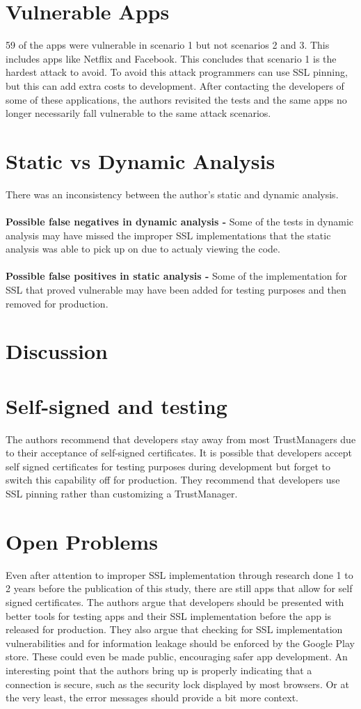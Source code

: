 \documentclass{article}
\begin{document}
\section*{Vulnerable Apps}
59 of the apps were vulnerable in scenario 1 but not scenarios 2 and 3. This includes apps like Netflix and Facebook. This concludes that scenario 1 is the hardest attack to avoid. To avoid this attack programmers can use SSL pinning, but this can add extra costs to development. After contacting the developers of some of these applications, the authors revisited the tests and the same apps no longer necessarily fall vulnerable to the same attack scenarios. 
\section*{Static vs Dynamic Analysis}
There was an inconsistency between the author's static and dynamic analysis.
\\\\\textbf{Possible false negatives in dynamic analysis -} Some of the tests in dynamic analysis may have missed the improper SSL implementations that the static analysis was able to pick up on due to actualy viewing the code. 
\\\\\textbf{Possible false positives in static analysis -} Some of the implementation for SSL that proved vulnerable may have been added for testing purposes and then removed for production.

\section{Discussion}
\section*{Self-signed and testing}
The authors recommend that developers stay away from most TrustManagers due to their acceptance of self-signed certificates. It is possible that developers accept self signed certificates for testing purposes during development but forget to switch this capability off for production. They recommend that developers use SSL pinning rather than customizing a TrustManager. 
\section*{Open Problems}
Even after attention to improper SSL implementation through research done 1 to 2 years before the publication of this study, there are still apps that allow for self signed certificates. The authors argue that developers should be presented with better tools for testing apps and their SSL implementation before the app is released for production. They also argue that checking for SSL implementation vulnerabilities and for information leakage should be enforced by the Google Play store. These could even be made public, encouraging safer app development. An interesting point that the authors bring up is properly indicating that a connection is secure, such as the security lock displayed by most browsers. Or at the very least, the error messages should provide a bit more context. 
\end{document}
